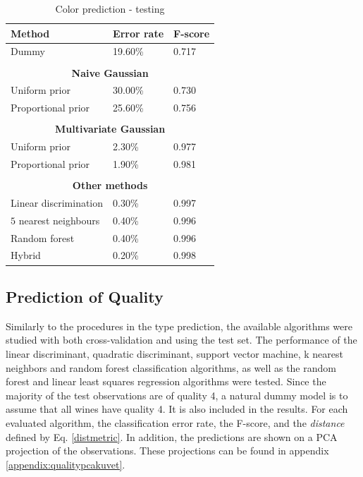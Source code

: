 \documentclass[twoside]{article}
\begin{document}
\begin{multicols}{2}
\begin{table}[H]
\caption{Color prediction - testing}
\label{table:color_testing}
\begin{tabular}{lll}
\textbf{Method} & \textbf{Error rate} & \textbf{F-score}\\
\midrule
Dummy & 19.60\% & 0.717 \\
\\
\multicolumn{3}{c}{\textbf{Naive Gaussian}} \\
Uniform prior & 30.00\% & 0.730 \\
Proportional prior & 25.60\% & 0.756 \\
\\
\multicolumn{3}{c}{\textbf{Multivariate Gaussian}} \\
Uniform prior & 2.30\% & 0.977 \\
Proportional prior & 1.90\% & 0.981 \\
\\
\multicolumn{3}{c}{\textbf{Other methods}} \\
Linear discrimination & 0.30\% & 0.997 \\
$5$ nearest neighbours & 0.40\% & 0.996 \\
Random forest & 0.40\% & 0.996 \\
Hybrid & 0.20\% & 0.998 \\

\end{tabular}
\end{table}

\subsection{Prediction of Quality}

Similarly to the procedures in the type prediction, the available algorithms were studied with both cross-validation and using the test set. 
The performance of the linear discriminant, quadratic discriminant, support vector machine, k nearest neighbors and random forest
classification algorithms, as well as the random forest and linear least squares regression algorithms were tested.
Since the majority of the test observations are of quality 4, a natural dummy model is to assume that all wines have quality 4.
It is also included in the results.
For each evaluated algorithm, the classification error rate, the F-score, and the \emph{distance} defined by Eq. \eqref{distmetric}. In addition, the predictions are shown on a PCA projection
of the observations. These projections can be found in appendix \ref{appendix:qualitypcakuvet}.


\end{multicols}
\end{document}
